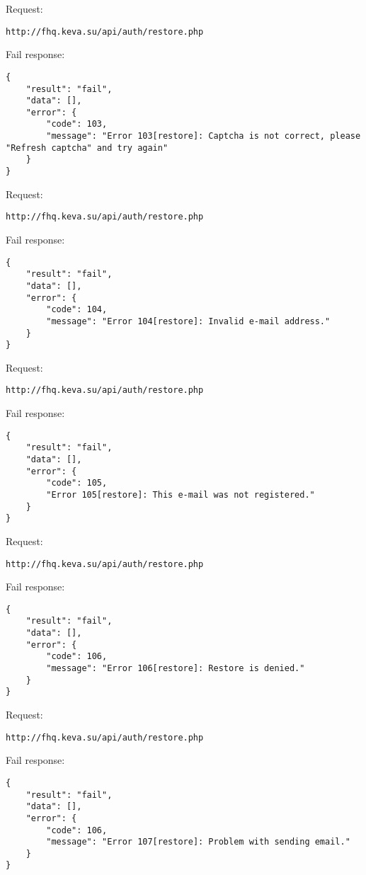 Request:
\begin{Verbatim}[frame=single]
http://fhq.keva.su/api/auth/restore.php
\end{Verbatim}
Fail response:
\begin{Verbatim}[frame=single]
{
    "result": "fail",
    "data": [],
    "error": {
        "code": 103,
        "message": "Error 103[restore]: Captcha is not correct, please "Refresh captcha" and try again"
    }
}
\end{Verbatim}

Request:
\begin{Verbatim}[frame=single]
http://fhq.keva.su/api/auth/restore.php
\end{Verbatim}
Fail response:
\begin{Verbatim}[frame=single]
{
    "result": "fail",
    "data": [],
    "error": {
        "code": 104,
        "message": "Error 104[restore]: Invalid e-mail address."
    }
}
\end{Verbatim}

Request:
\begin{Verbatim}[frame=single]
http://fhq.keva.su/api/auth/restore.php
\end{Verbatim}
Fail response:
\begin{Verbatim}[frame=single]
{
    "result": "fail",
    "data": [],
    "error": {
        "code": 105,
        "Error 105[restore]: This e-mail was not registered."
    }
}
\end{Verbatim}

Request:
\begin{Verbatim}[frame=single]
http://fhq.keva.su/api/auth/restore.php
\end{Verbatim}

Fail response:
\begin{Verbatim}[frame=single]
{
    "result": "fail",
    "data": [],
    "error": {
        "code": 106,
        "message": "Error 106[restore]: Restore is denied."
    }
}
\end{Verbatim}

Request:
\begin{Verbatim}[frame=single]
http://fhq.keva.su/api/auth/restore.php
\end{Verbatim}

Fail response:
\begin{Verbatim}[frame=single]
{
    "result": "fail",
    "data": [],
    "error": {
        "code": 106,
        "message": "Error 107[restore]: Problem with sending email."
    }
}
\end{Verbatim}

